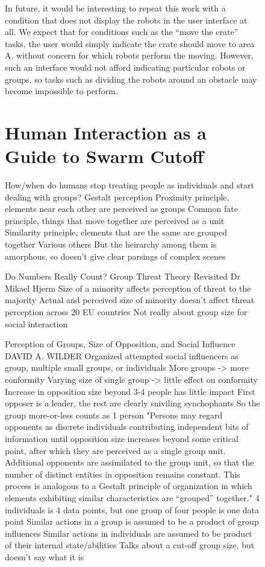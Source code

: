 \begin{subfigure}{0.48\textwidth}
In future, it would be interesting to repeat this work with a condition that does not display the robots in the user interface at all. 
We expect that for conditions such as the ``move the crate'' tasks, the user would simply indicate the crate should move to area A, without concern for which robots perform the moving. 
However, such an interface would not afford indicating particular robots or groups, so tasks such as dividing the robots around an obstacle may become impossible to perform.

\section{Human Interaction as a Guide to Swarm Cutoff}

How/when do humans stop treating people as individuals and start dealing with groups?
	Gestalt perception 
		Proximity principle, elements near each other are perceived as groups
		Common fate principle, things that move together are perceived as a unit
		Similarity principle, elements that are the same are grouped together
		Various others
			But the heirarchy among them is amorphous, so doesn't give clear parsings of complex scenes

Do Numbers Really Count? Group Threat Theory Revisited
Dr Mikael Hjerm
	Size of a minority affects perception of threat to the majority
	Actual and perceived size of minority doesn't affect threat perception across 20 EU countries
	Not really about group size for social interaction

Perception of Groups, Size of Opposition, and Social Influence
DAVID A. WILDER
	Organized attempted social influencers as group, multiple small groups, or individuals
	More groups -> more conformity
	Varying size of single group -> little effect on conformity
	Increase in opposition size beyond 3-4 people has little impact
		First opposer is a leader, the rest are clearly sniviling synchophants
		So the group more-or-less counts as 1 person
	"Persons may regard opponents as discrete individuals contributing independent bits of information until opposition size increases beyond some critical point, after which they are perceived as a single group unit. Additional opponents are assimilated to the group unit, so that the number of distinct entities in opposition remains constant. This process is analogous to a Gestalt principle of organization in which elements exhibiting similar characteristics are “grouped” together."
	4 individuals is 4 data points, but one group of four people is one data point
	Similar actions in a group is assumed to be a product of group influences
	Similar actions in individuals are assumed to be product of their internal state/abilities
	Talks about a cut-off group size, but doesn't say what it is


\end{subfigure}
